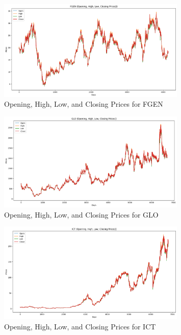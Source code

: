 \begin{figure}[ht]
    \centering
    \includegraphics[width=0.80\textwidth]{./assets/Appendices/B/OHLC_Prices/FGEN.png}
    \caption{Opening, High, Low, and Closing Prices for FGEN}
    \label{fig:ohlc_FGEN}
\end{figure}
\FloatBarrier

\begin{figure}[ht]
    \centering
    \includegraphics[width=0.80\textwidth]{./assets/Appendices/B/OHLC_Prices/GLO.png}
    \caption{Opening, High, Low, and Closing Prices for GLO}
    \label{fig:ohlc_GLO}
\end{figure}
\FloatBarrier

\begin{figure}[ht]
    \centering
    \includegraphics[width=0.80\textwidth]{./assets/Appendices/B/OHLC_Prices/ICT.png}
    \caption{Opening, High, Low, and Closing Prices for ICT}
    \label{fig:ohlc_ICT}
\end{figure}
\FloatBarrier


